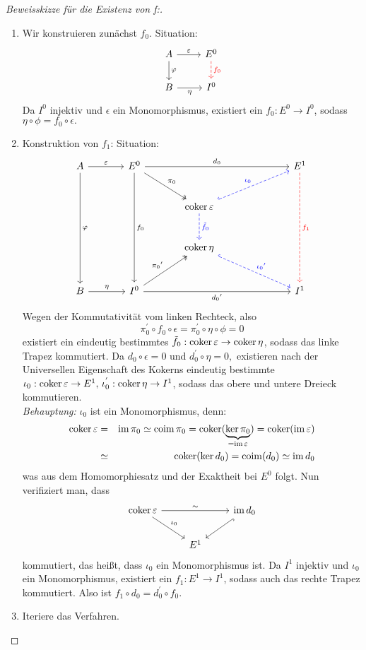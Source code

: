 \begin{proof}[Beweisskizze für die Existenz von f:] 
	\begin{enumerate}
		\item Wir konstruieren zunächst $f_0$. Situation: 
		$$\begin{tikzcd}
		 A \arrow{d}{\phi} \arrow{r}{\epsilon}& E^0 \arrow[dashed,red]{d}{f_0} \\
		 B \arrow[swap]{r}{\eta} & I^0 
		\end{tikzcd}$$
		Da $I^{0} $ injektiv und $\epsilon $ ein Monomorphismus, existiert ein $f_0: E^{0} \to I^{0} $, sodass $\eta \circ \phi = f_0 \circ \epsilon.$
		\item Konstruktion von $f_1$: Situation: \\
		$$\begin{tikzcd}[row sep = large, column sep = large]
		A \arrow{ddd}{\phi} \arrow{r}{\epsilon} & E^0 \arrow{ddd}{f_0}\arrow[two heads]{dr}{\pi_0}\arrow{rrr}{d_0} & & & E^1\arrow[red, dashed]{ddd}{f_1} \\
		& & \coker \epsilon\arrow[dashed, blue]{d}{\tilde{f}_0} \arrow[blue, dashed, hook]{urr}{\iota_0}\\
		& & \coker \eta\arrow[dashed, blue, hook]{drr}{{\iota_0}'} & & \\
		B\arrow{r}{\eta} & I^0\arrow[two heads]{ur}{{\pi_0}'}\arrow[swap]{rrr}{{d_0}'} & & &I^1
		\end{tikzcd}$$
		Wegen der Kommutativität vom linken Rechteck, also
		$$ \pi_0^{'} \circ f_0 \circ \epsilon = \pi_0^{'} \circ \eta \circ \phi = 0 $$ existiert ein eindeutig bestimmtes $ \tilde{f}_0: \operatorname{coker}\varepsilon \to \operatorname{coker} \eta$, sodass das linke Trapez kommutiert. Da $ d_0 \circ \epsilon = 0$ und $ d_0^{'} \circ \eta = 0, $ existieren nach der Universellen Eigenschaft des Kokerns eindeutig bestimmte $ \iota_0: \operatorname{coker}\varepsilon \to E^{1}, \, \iota_0^{'}: \operatorname{coker} \eta \to I^{1}$, sodass das obere und untere Dreieck kommutieren.\\ \emph{Behauptung:} $\iota_0$ ist ein Monomorphismus, denn: \begin{eqnarray*}
			\operatorname{coker} \varepsilon &=& \operatorname{im} \pi_0 \simeq \operatorname{coim} \pi_0 = \operatorname{coker}(\underbrace{\ker \pi_0}_{=\operatorname{im} \varepsilon}) = \operatorname{coker}(\operatorname{im}\varepsilon)\\ &\simeq& \operatorname{coker}(\ker d_0)
		 =\operatorname{coim}(d_0) \simeq \operatorname{im} d_0
		\end{eqnarray*}
		was aus dem Homomorphiesatz und der Exaktheit bei $E^{0}$ folgt. Nun verifiziert man, dass 
		$$\begin{tikzcd}
		 \coker \epsilon \arrow{rr}{\sim} \arrow{dr}{\iota_0} && \im d_0 \arrow[hook]{dl}\\
		 & E^1 &
		\end{tikzcd}$$
		kommutiert, das heißt, dass $\iota_0$ ein Monomorphismus ist. Da $I^1 $ injektiv und $\iota_0$ ein Monomorphismus, existiert ein $f_1: E^1 \to I^1$, sodass auch das rechte Trapez kommutiert. Also ist $f_1 \circ d_0 = d_0^{'} \circ f_0 $. 
		\item Iteriere das Verfahren.
	\end{enumerate}
\end{proof}
